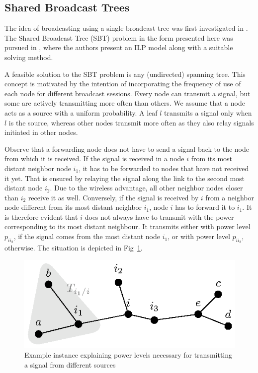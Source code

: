 \subsection{Shared Broadcast Trees}\label{sec:sbt}

The idea of broadcasting using a single broadcast tree was first investigated in \cite{papadimitriou06}.
The Shared Broadcast Tree (SBT) problem in the form presented here was pursued in \cite{yuan12}, where the authors present an ILP model along with a suitable solving method.

A feasible solution to the SBT problem is any (undirected) spanning tree.
This concept is motivated by the intention of incorporating the frequency of use of each node for different broadcast sessions.
Every node can transmit a signal, but some are actively transmitting more often than others.
We assume that a node acts as a source with a uniform probability. 
A leaf $l$ transmits a signal only when $l$ is the source, whereas other nodes transmit more often as they also relay signals initiated in other nodes.

Observe that a forwarding node does not have to send a signal back to the node from which it is received.
If the signal is received in a node $i$ from its most distant neighbor node $i_1$, it has to be forwarded to nodes that have not received it yet.
That is ensured by relaying the signal along the link to the second most distant node $i_2$.
Due to the wireless advantage, all other neighbor nodes closer than $i_2$ receive it as well.
Conversely, if the signal is received by $i$ from a neighbor node different from its most distant neighbor $i_1$, node $i$ has to forward it to $i_1$. 
It is therefore evident that $i$ does not always have to transmit with the power corresponding to its most distant neighbour.
It transmits either with power level $p_{ii_2}$, if the signal comes from the most distant node $i_1$, or with power level $p_{ii_2}$, otherwise.
The situation is depicted in Fig~\ref{fig:objexp}.
\begin{figure}[htb!]
  \centering
  \includegraphics[scale=1.4]{figurer/objexp.eps}
  \caption{Example instance explaining power levels necessary for transmitting a signal from different sources}
  \label{fig:objexp}
\end{figure}


